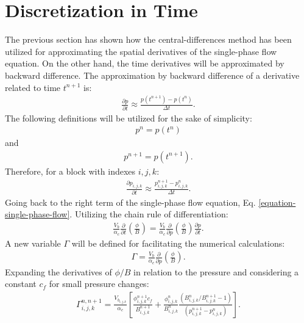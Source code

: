 \section{Discretization in Time}

The previous section has shown how the central-differences method has been utilized for approximating the spatial derivatives of the single-phase flow equation.
%
On the other hand, the time derivatives will be approximated by backward difference.
%
The approximation by backward difference of a derivative related to time $t^{n+1}$ is:
%
\begin{align}
	\label{equation-time-derivative-approximation}
	\frac{\partial p}{\partial t} \approx \frac{p(t^{n+1})-p(t^n)}{\Delta t}.
\end{align}
%
The following definitions will be utilized for the sake of simplicity:
%
\begin{align}
	\label{equation-n-superindex-definition}
	p^n=p(t^n)
\end{align}
%
and
%
\begin{align}
	\label{equation-n-plus-one-superindex-definition}
	p^{n+1}=p(t^{n+1}).
\end{align}
%
Therefore, for a block with indexes $i,j,k$:
%
\begin{align}
	\label{equation-time-derivative-approximation-rewritten}
	\frac{\partial p_{i,j,k}}{\partial t} \approx \frac{p_{i,j,k}^{n+1}-p_{i,j,k}^n}{\Delta t}.
\end{align}
%
Going back to the right term of the single-phase flow equation, Eq. \ref{equation-single-phase-flow}.
%
Utilizing the chain rule of differentiation:
%
\begin{align}
	\label{equation-time-derivative-chain-rule}
	\frac {V_b}{\alpha_c}\frac{\partial}{\partial t}\left( \frac{\phi}{B}\right) = \frac {V_b}{\alpha_c}\frac{\partial}{\partial p}\left( \frac{\phi}{B}\right)\frac{\partial p}{\partial t}.
\end{align}
%
A new variable $\Gamma$ will be defined for facilitating the numerical calculations:
%
%
\begin{align}
	\label{equation-Gamma-definition}
	\Gamma = \frac {V_b}{\alpha_c}\frac{\partial}{\partial p}\left( \frac{\phi}{B}\right).
\end{align}
%
Expanding the derivatives of $\phi / B$ in relation to the pressure and considering a constant $c_f$ for small pressure changes:
%
\begin{align}
	\label{equation-time-derivative-discretization-expanded}
	\Gamma^{n,n+1}_{i,j,k} = \frac {V_{b_{i,j,k}}}{\alpha_c} \left[ \frac{\phi^{n+1}_{i,j,k} c_f}{B^{n+1}_{i,j,k}} + \frac{\phi^n_{i,j,k}}{B^n_{i,j,k}} \frac{ \left( B^n_{i,j,k}/B^{n+1}_{i,j,k}-1\right) } { (p^{n+1}_{i,j,k} - p^{n}_{i,j,k}) } \right].
\end{align}
